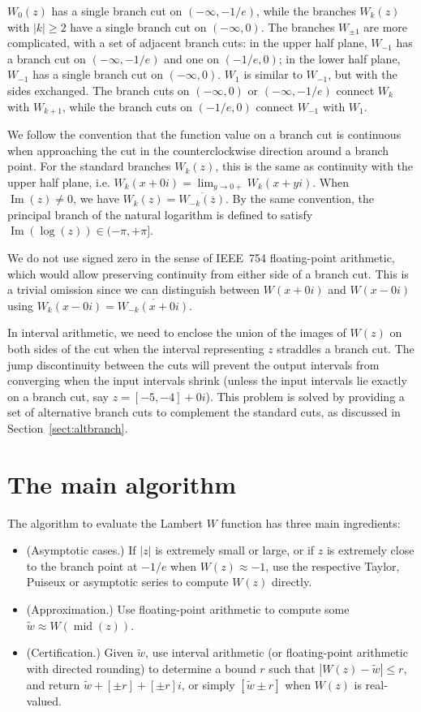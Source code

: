 \documentclass[11pt,a4paper]{article}
\begin{document}
$W_0(z)$ has a single branch cut on $(-\infty,-1/e)$, while
the branches $W_k(z)$ with $|k| \ge 2$ have a single branch cut on $(-\infty,0)$.
The branches $W_{\pm 1}$ are more complicated, with a set of adjacent branch cuts:
in the upper half plane, $W_{-1}$ has a branch cut on $(-\infty,-1/e)$ and one on $(-1/e,0)$;
in the lower half plane, $W_{-1}$ has a single branch cut on $(-\infty,0)$.
$W_{1}$ is similar to $W_{-1}$, but with the sides exchanged.
The branch cuts on $(-\infty,0)$ or $(-\infty,-1/e)$ connect $W_k$ with $W_{k+1}$,
while the branch cuts on $(-1/e,0)$ connect $W_{-1}$ with $W_1$.

We follow the convention that the function value on a branch cut is
continuous when approaching the cut in the counterclockwise direction
around a branch point. For the standard branches $W_k(z)$, this is the
same as continuity with the upper half plane, i.e. $W_k(x+0i) = \lim_{y\to 0+} W_k(x + yi)$.
When $\operatorname{Im}(z) \ne 0$, we have $W_k(z) = \overline{W_{-k}(\overline{z})}$.
By the same convention, the principal branch of the natural logarithm
is defined to satisfy
$\operatorname{Im}(\log(z)) \in (-\pi, +\pi]$.

We do not use signed zero in the sense of
IEEE~754 floating-point arithmetic, which would allow preserving
continuity from either side of a branch cut.
This is a trivial omission since
we can distinguish between $W(x+0i)$ and
$W(x-0i)$ using $W_k(x-0i) = \overline{W_{-k}(x+0i)}$.

In interval arithmetic, we need to enclose the union of the images
of $W(z)$ on both sides of the cut when the interval representing
$z$ straddles a branch cut.
The jump discontinuity between the cuts will prevent the output intervals
from converging when the input intervals shrink
(unless the input intervals lie exactly on
a branch cut, say $z = [-5,-4] + 0i$).
This problem is solved by providing a set of
alternative branch cuts to complement the standard cuts,
as discussed in Section~\ref{sect:altbranch}.

\section{The main algorithm}

The algorithm to evaluate the Lambert $W$ function has three main ingredients:

\begin{itemize}
\item (Asymptotic cases.) If $|z|$ is extremely small or large, or if $z$ is extremely close to the branch point at $-1/e$ when $W(z) \approx -1$, use the respective Taylor, Puiseux or asymptotic series to compute $W(z)$ directly.
\item (Approximation.) Use floating-point arithmetic to compute some $\tilde w \approx W(\operatorname{mid}(z))$.
\item (Certification.) Given $\tilde w$, use interval arithmetic (or floating-point arithmetic with directed rounding) to determine a bound $r$ such that $|W(z)-\tilde w| \le r$, and return $\tilde w + [\pm r] + [\pm r]i$,
or simply $[\tilde w \pm r]$ when $W(z)$ is real-valued.
\end{itemize}
\end{document}
